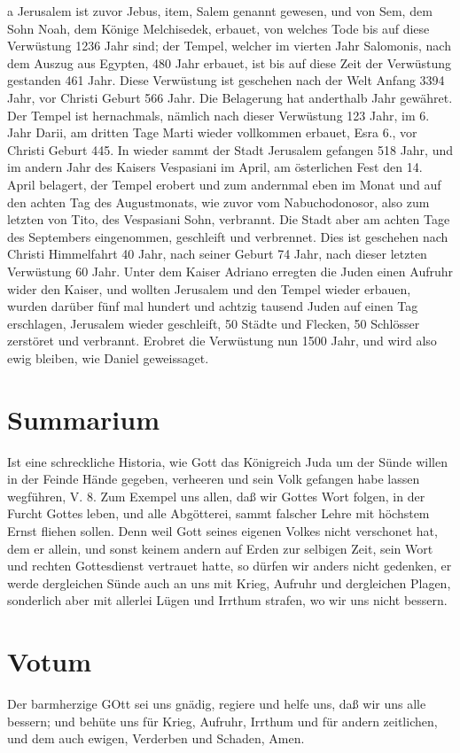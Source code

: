 a Jerusalem ist zuvor Jebus, item, Salem genannt gewesen, und von Sem, dem Sohn Noah, dem Könige Melchisedek, erbauet, von welches Tode bis auf diese Verwüstung 1236 Jahr sind; der Tempel, welcher im vierten Jahr Salomonis, nach dem Auszug aus Egypten, 480 Jahr erbauet, ist bis auf diese Zeit der Verwüstung gestanden 461 Jahr. Diese Verwüstung ist geschehen nach der Welt Anfang 3394 Jahr, vor Christi Geburt 566 Jahr. Die Belagerung hat anderthalb Jahr gewähret. Der Tempel ist hernachmals, nämlich nach dieser Verwüstung 123 Jahr, im 6. Jahr Darii, am dritten Tage Marti wieder vollkommen erbauet, Esra 6., vor Christi Geburt 445. In wieder sammt der Stadt Jerusalem gefangen 518 Jahr, und im andern Jahr des Kaisers Vespasiani im April, am österlichen Fest den 14. April belagert, der Tempel erobert und zum andernmal eben im Monat und auf den achten Tag des Augustmonats, wie zuvor vom Nabuchodonosor, also zum letzten von Tito, des Vespasiani Sohn, verbrannt. Die Stadt aber am achten Tage des Septembers eingenommen, geschleift und verbrennet. Dies ist geschehen nach Christi Himmelfahrt 40 Jahr, nach seiner Geburt 74 Jahr, nach dieser letzten Verwüstung 60 Jahr. Unter dem Kaiser Adriano erregten die Juden einen Aufruhr wider den Kaiser, und wollten Jerusalem und den Tempel wieder erbauen, wurden darüber fünf mal hundert und achtzig tausend Juden auf einen Tag erschlagen, Jerusalem wieder geschleift, 50 Städte und Flecken, 50 Schlösser zerstöret und verbrannt. Erobret die Verwüstung nun 1500 Jahr, und wird also ewig bleiben, wie Daniel geweissaget.

\section{Summarium}

Ist eine schreckliche Historia, wie Gott das Königreich Juda um der Sünde willen in der Feinde Hände gegeben, verheeren und sein Volk gefangen habe lassen wegführen, V. 8. Zum Exempel uns allen, daß wir Gottes Wort folgen, in der Furcht Gottes leben, und alle Abgötterei, sammt falscher Lehre mit höchstem Ernst fliehen sollen. Denn weil Gott seines eigenen Volkes nicht verschonet hat, dem er allein, und sonst keinem andern auf Erden zur selbigen Zeit, sein Wort und rechten Gottesdienst vertrauet hatte, so dürfen wir anders nicht gedenken, er werde dergleichen Sünde auch an uns mit Krieg, Aufruhr und dergleichen Plagen, sonderlich aber mit allerlei Lügen und Irrthum strafen, wo wir uns nicht bessern.

\section{Votum}

Der barmherzige GOtt sei uns gnädig, regiere und helfe uns, daß wir uns alle bessern; und behüte uns für Krieg, Aufruhr, Irrthum und für andern zeitlichen, und dem auch ewigen, Verderben und Schaden, Amen.
